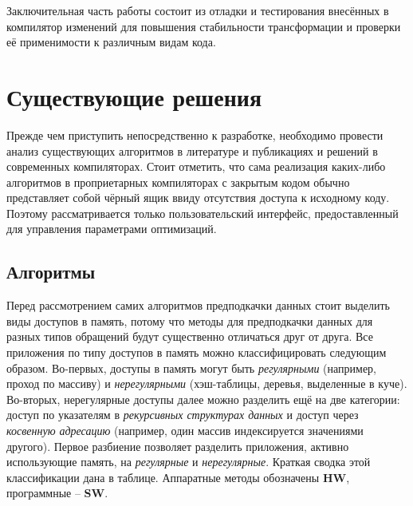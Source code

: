 \documentclass[12pt,a4paper,oneside]{article}
\begin{document}
Заключительная часть работы состоит из отладки и тестирования внесённых в компилятор изменений для повышения стабильности трансформации и проверки её применимости к различным видам кода.

\section{Существующие решения}

\indent

Прежде чем приступить непосредственно к разработке, необходимо провести анализ существующих алгоритмов в литературе и публикациях и решений в современных компиляторах. Стоит отметить, что сама реализация каких-либо алгоритмов в проприетарных компиляторах с закрытым кодом обычно представляет собой чёрный ящик ввиду отсутствия доступа к исходному коду. Поэтому рассматривается только пользовательский интерфейс, предоставленный для управления параметрами оптимизаций.

\subsection{Алгоритмы}

\indent

Перед рассмотрением самих алгоритмов предподкачки данных стоит выделить виды доступов в память, потому что методы для предподкачки данных для разных типов обращений будут существенно отличаться друг от друга. Все приложения по типу доступов в память можно классифицировать следующим образом\cite{LeeMemClass}. Во-первых, доступы в память могут быть \emph{регулярными} (например, проход по массиву) и \emph{нерегулярными} (хэш-таблицы, деревья, выделенные в куче). Во-вторых, нерегулярные доступы далее можно разделить ещё на две категории: доступ по указателям в \emph{рекурсивных структурах данных} и доступ через \emph{косвенную адресацию} (например, один массив индексируется значениями другого). Первое разбиение позволяет разделить приложения, активно использующие память, на \emph{регулярные} и \emph{нерегулярные}. Краткая сводка этой классификации дана в таблице. Аппаратные методы обозначены \textbf{HW}, программные -- \textbf{SW}.
\end{document}

